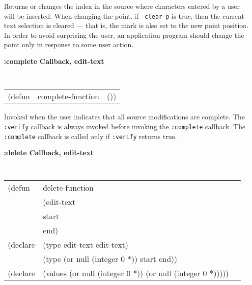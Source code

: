 \begin{flushright} \parbox[t]{6.125in}{
Returns or changes the index in the
source where characters entered by a user will be inserted. When
changing the point, if {\tt
clear-p} is true, then the current text selection is cleared --- that
is, the mark is also
set to the new point position. In order to avoid
surprising the user, an application program should change the point only in
response to some user action.
 } 
\end{flushright}












{\samepage
{\large {\bf :complete \hfill Callback, edit-text}} 
\begin{flushright} 
\parbox[t]{6.125in}{
\tt
\begin{tabular}{lll}
\raggedright
(defun & complete-function & ())
\end{tabular}
\rm

}\end{flushright}}

\begin{flushright} \parbox[t]{6.125in}{
Invoked when the user indicates that all source modifications are complete.
The {\tt :verify} callback
is always invoked before invoking the {\tt :complete} callback. The {\tt
:complete} callback is called only if 
{\tt :verify} returns true.


}\end{flushright}


{\samepage
{\large {\bf :delete \hfill Callback, edit-text}} 
\begin{flushright} 
\parbox[t]{6.125in}{
\tt
\begin{tabular}{lll}
\raggedright
(defun & delete-function & \\
       & (edit-text\\
       & start\\
       & end)\\
(declare & (type  edit-text  edit-text)\\
         & (type (or null (integer 0 *))  start end))\\
(declare & (values (or null (integer 0 *)) (or null (integer 0 *)))))
\end{tabular}
\rm

}\end{flushright}}


